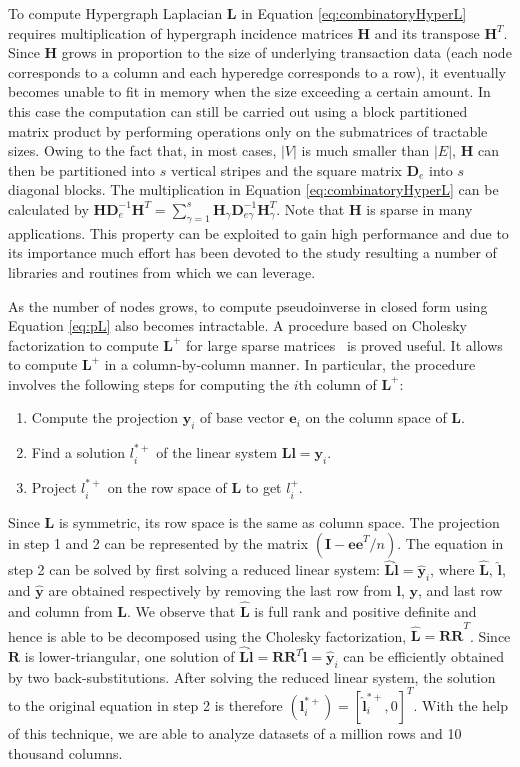 To compute Hypergraph Laplacian $\mathbf{L}$ in Equation \ref{eq:combinatoryHyperL} requires multiplication of hypergraph incidence matrices $\mathbf{H}$ and its transpose $\mathbf{H}^T$. Since $\mathbf{H}$ grows in proportion to the size of underlying transaction data (each node corresponds to a column and each hyperedge corresponds to a row), it eventually becomes unable to fit in memory when the size exceeding a certain amount. In this case the computation can still be carried out using a block partitioned matrix product by performing operations only on the submatrices of tractable sizes. Owing to the fact that, in most cases, $|V|$ is much smaller than $|E|$, $\mathbf{H}$ can then be partitioned into $s$ vertical stripes and the square matrix $\mathbf{D}_e$ into $s$ diagonal blocks. The multiplication in Equation \ref{eq:combinatoryHyperL} can be calculated by $\mathbf{HD}_e^{-1}\mathbf{H}^T=\sum_{\gamma=1}^s{\mathbf{H}_\gamma\mathbf{D}_{e\gamma}^{-1}\mathbf{H}_\gamma^T}$. Note that $\mathbf{H}$ is sparse in many applications. This property can be exploited to gain high performance and due to its importance much effort has been devoted to the study resulting a number of libraries and routines from which we can leverage.

As the number of nodes grows, to compute pseudoinverse in closed form using Equation \ref{eq:pL} also becomes intractable. A procedure based on Cholesky factorization to compute $\mathbf{L}^+$ for large sparse matrices~\cite{matrix} is proved useful. It allows to compute $\mathbf{L}^+$ in a column-by-column manner. In particular, the procedure involves the following steps for computing the $i$th column of $\mathbf{L}^+$:
\begin{enumerate}
\item Compute the projection $\mathbf{y}_i$ of base vector $\mathbf{e}_i$ on the column space of $\mathbf{L}$.
\item Find a solution $l_i^{*+}$ of the linear system $\mathbf{Ll}=\mathbf{y}_i$.
\item Project $l_i^{*+}$ on the row space of $\mathbf{L}$ to get $l_i^+$.
\end{enumerate}
Since $\mathbf{L}$ is symmetric, its row space is the same as column space. The projection in step 1 and 2 can be represented by the matrix $(\mathbf{I-ee}^T/n)$. The equation in step 2 can be solved by first solving a reduced linear system: $\mathbf{\hat{L}\hat{l}}=\mathbf{\hat{y}}_i$, where $\mathbf{\hat{L}}$, $\mathbf{\hat{l}}$, and $\mathbf{\hat{y}}$ are obtained respectively by removing the last row from $\mathbf{l}$, $\mathbf{y}$, and last row and column from $\mathbf{L}$. We observe that $\mathbf{\hat{L}}$ is full rank and positive definite and hence is able to be decomposed using the Cholesky factorization, $\mathbf{\hat{L}=RR}^T$. Since $\mathbf{R}$ is lower-triangular, one solution of $\mathbf{\hat{L}\hat{l}}=\mathbf{RR}^T\mathbf{\hat{l}}=\mathbf{\hat{y}}_i$ can be efficiently obtained by two back-substitutions. After solving the reduced linear system, the solution to the original equation in step 2 is therefore $(\mathbf{l}_i^{*+})=[\mathbf{\hat{l}}_i^{*+},0]^T$. With the help of this technique, we are able to analyze datasets of a million rows and 10 thousand columns.


